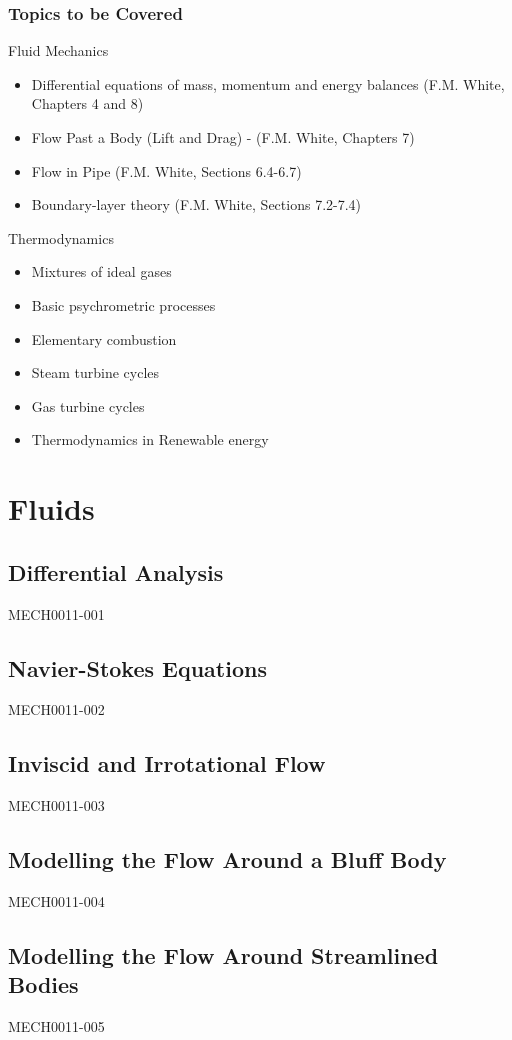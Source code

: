\documentclass[12pt]{report}
\numberwithin{equation}{section}
\begin{document}
\section*{Topics to be Covered}
Fluid Mechanics
\begin{itemize}[noitemsep]
    \item Differential equations of mass, momentum and energy balances (F.M. White, Chapters 4 and 8) 
    \item Flow Past a Body (Lift and Drag) - (F.M. White, Chapters 7)
    \item Flow in Pipe (F.M. White, Sections 6.4-6.7)
    \item Boundary-layer theory (F.M. White, Sections 7.2-7.4)
\end{itemize}
Thermodynamics
\begin{itemize}[noitemsep]
    \item Mixtures of ideal gases
    \item Basic psychrometric processes
    \item Elementary combustion
    \item Steam turbine cycles
    \item Gas turbine cycles
    \item Thermodynamics in Renewable energy
\end{itemize}

\part{Fluids}
\chapter{Differential Analysis}
{MECH0011-001}
\chapter{Navier-Stokes Equations}
{MECH0011-002}
\chapter{Inviscid and Irrotational Flow}
{MECH0011-003}
\chapter{Modelling the Flow Around a Bluff Body}
{MECH0011-004}
\chapter{Modelling the Flow Around Streamlined Bodies}
{MECH0011-005}
\end{document}
